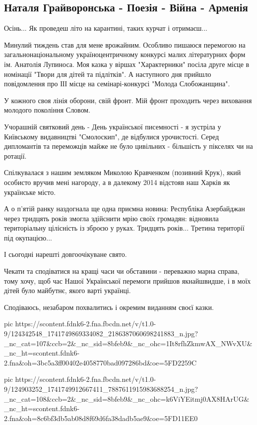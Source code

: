  
 
 

\subsection{Наталя Грайворонська - Поезія - Війна - Арменія}
\label{sec:10_11_2020.fb.natalja_gajvoronska.1.poezia_azer_vojna}

Осінь... Як проведеш літо на карантині,  таких курчат і отримаєш...

Минулий тиждень став для мене врожайним. Особливо пишаюся перемогою на
загальнонаціональному україноцентричному  конкурсі малих  літературних форм ім.
Анатолія Лупиноса. Моя казка у віршах "Характерники" посіла друге місце в
номінації "Твори для дітей та підлітків". А наступного дня прийшло повідомлення
про ІІІ місце на семінарі-конкурсі "Молода Слобожанщина".

У кожного своя лінія оборони, свій фронт.  Мій фронт проходить через виховання
молодого покоління Словом. 

Учорашній святковий день - День української писемності - я зустріла у
Київському видавництві "Смолоскип", де відбулися урочистості. Серед дипломантів
та переможців майже не було цивільних - більшість у пікселях чи на ротації.

Спілкувалася з нашим земляком Миколою Кравченком (позивний Крук), який особисто
вручив мені нагороду, а в далекому 2014 відстояв наш Харків як українське
місто. 

А о п'ятій ранку наздогнала ще одна приємна новина: Республіка Азербайджан
через тридцять років змогла здійснити мрію своїх громадян: відновила
територіальну цілісність із зброєю у руках. Тридцять років... Третина території
під окупацією... 

І сьогодні нарешті довгоочікуване свято. 

Чекати та сподіватися на кращі часи чи обставини - переважно марна справа,
тому хочу,  щоб час Нашої Української перемоги прийшов якнайшвидше, і в моїх
дітей було майбутнє, якого варті українці. 

Сподіваюсь, незабаром похвалитись і окремим виданням своєї казки.

\ifcmt
pic https://scontent.fdnk6-2.fna.fbcdn.net/v/t1.0-9/124342548_1741749869334082_2186387060698241883_n.jpg?_nc_cat=107&ccb=2&_nc_sid=8bfeb9&_nc_ohc=1It8rfhZkmwAX_NWvXU&_nc_ht=scontent.fdnk6-2.fna&oh=3bc5a3ff00402e4058770bad097286bd&oe=5FD2259C

pic https://scontent.fdnk6-2.fna.fbcdn.net/v/t1.0-9/124903252_1741749912667411_7887611915983688254_n.jpg?_nc_cat=108&ccb=2&_nc_sid=8bfeb9&_nc_ohc=k6ViYEitmj0AX8HArUG&_nc_ht=scontent.fdnk6-2.fna&oh=8c6bf3db5ab08d8f69d6fa38dadb5ae9&oe=5FD11EE0

\fi
